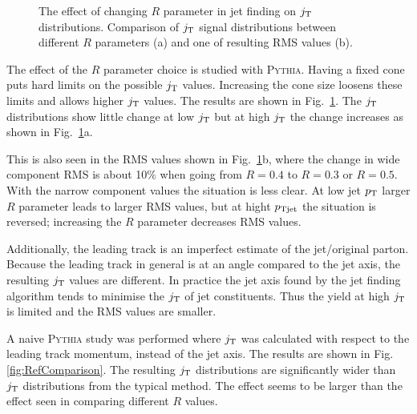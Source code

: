 \begin{figure}[htp]
\centering
{}
\caption[\textsc{Pythia} $R$ parameters $\jt{}$]{The effect of changing $R$ parameter in jet finding on $\jt{}$ distributions. Comparison of $\jt{}$ signal distributions between different $R$ parameters (a) and one of resulting RMS values (b).}
\label{fig:Rcomparison}
\end{figure}


The effect of the $R$ parameter choice is studied with \textsc{Pythia}. Having a fixed cone puts hard limits on the possible $\jt{}$ values. Increasing the cone size loosens these limits and allows higher $\jt{}$ values. The results are shown in Fig.~\ref{fig:Rcomparison}. The $\jt{}$ distributions show little change at low $\jt{}$ but at high $\jt{}$ the change increases as shown in Fig.~\ref{fig:Rcomparison}a.  

This is also seen in the RMS values shown in Fig.~\ref{fig:Rcomparison}b, where the change in wide component RMS is about 10\% when going from $R=0.4$ to $R=0.3$ or $R=0.5$. With the narrow component values the situation is less clear. At low jet $p_{\rm T}$ larger $R$ parameter leads to larger RMS values, but at hight $p_{\rm Tjet}$ the situation is reversed; increasing the $R$ parameter decreases RMS values.

Additionally, the leading track is an imperfect estimate of the jet/original parton. Because the leading track in general is at an angle compared to the jet axis, the resulting $\jt{}$ values are different. In practice the jet axis found by the jet finding algorithm tends to minimise the $\jt{}$ of jet constituents. Thus the yield at high $\jt{}$ is limited and the RMS values are smaller.

A naive \textsc{Pythia} study was performed where $\jt{}$ was calculated with respect to the leading track momentum, instead of the jet axis. The results are shown in Fig. \ref{fig:RefComparison}. The resulting $\jt{}$ distributions are significantly wider than $\jt{}$ distributions from the typical method. The effect seems to be larger than the effect seen in comparing different $R$ values.

